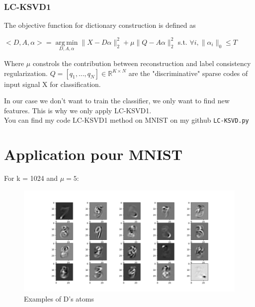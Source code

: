 \documentclass[a4paper,10pt]{article}
\newcommand{\R}{\mathbb{R}}
\DeclareMathOperator*{\argmin}{arg\,min}
\begin{document}
\subsubsection{LC-KSVD1}
The objective function for dictionary construction is  defined as
\begin{center}
 $<D,A,\alpha> = \underset{D,A,\alpha}{\argmin} \| X - D\alpha \|^2_2 + \mu \|Q -A\alpha\|^2_2$  s.t. $\forall i, \|\alpha_i\|_0 \leq T$
\end{center}

Where $\mu$ constrols the contribution between reconstruction and label consistency regularization. $Q = [q_1,...,q_N] \in \R^{K \times N}$ are the "discriminative" sparse codes of input signal X for classification.

In our case we don't want to train the classifier, we only want to find new features. This is why we only apply LC-KSVD1.\\
You can find my code LC-KSVD1 method on MNIST on my github \texttt{LC-KSVD.py}
\newpage

\section{Application pour MNIST}
For k = 1024 and $\mu = 5$:

\begin{figure}[h]
 \centering
 \includegraphics[scale=0.5]{Results/LC-KSVD_X_ALL_K_1024/D.png}
 \caption{Examples of D's atoms}
\end{figure}
\end{document}
